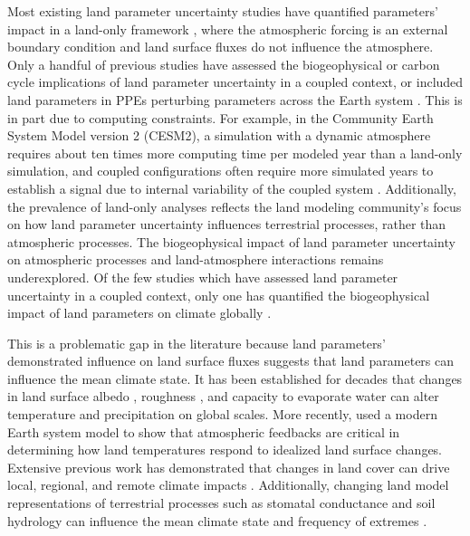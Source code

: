 \documentclass[draft]{agujournal2019}
\begin{document}
Most existing land parameter uncertainty studies have quantified parameters’ impact in a land-only framework \citep{zaehle_effects_2005, dagon_machine_2020, ricciuto_impact_2018, bauerle_carbon_2014, fisher_parametric_2019, dietze_quantitative_2014, bauerle_carbon_2014}, where the atmospheric forcing is an external boundary condition and land surface fluxes do not influence the atmosphere. Only a handful of previous studies have assessed the biogeophysical \citep{liu_constraining_2005,fischer_quantifying_2011,williams_land-atmosphere_2016} or carbon cycle \citep{booth_high_2012, booth_narrowing_2017, hawkins_parametric_2019, mcneall_constraining_2023} implications of land parameter uncertainty in a coupled context, or included land parameters in PPEs perturbing parameters across the Earth system \citep{sexton_perturbed_2021, yamazaki_perturbed_2021}. This is in part due to computing constraints. For example, in the Community Earth System Model version 2 (CESM2), a simulation with a dynamic atmosphere requires about ten times more computing time per modeled year than a land-only simulation, and coupled configurations often require more simulated years to establish a signal due to internal variability of the coupled system \citep{kay_community_2015}. Additionally, the prevalence of land-only analyses reflects the land modeling community’s focus on how land parameter uncertainty influences terrestrial processes, rather than atmospheric processes. The biogeophysical impact of land parameter uncertainty on atmospheric processes and land-atmosphere interactions remains underexplored. Of the few studies which have assessed land parameter uncertainty in a coupled context, only one has quantified the biogeophysical impact of land parameters on climate globally \citep{fischer_quantifying_2011}.

This is a problematic gap in the literature because land parameters’ demonstrated influence on land surface fluxes suggests that land parameters can influence the mean climate state. It has been established for decades that changes in land surface albedo \citep{charney_drought_1975, charney_dynamics_1975, charney_comparative_1977}, roughness \citep{sud_influence_1988}, and capacity to evaporate water \citep{shukla_influence_1982} can alter temperature and precipitation on global scales. More recently, \cite{lague_separating_2019} used a modern Earth system model to show that atmospheric feedbacks are critical in determining how land temperatures respond to idealized land surface changes. Extensive previous work has demonstrated that changes in land cover can drive local, regional, and remote climate impacts \citep[e.g.][]{pongratz_biogeophysical_2010,swann_mid-latitude_2012,boysen_global_2020}. Additionally, changing land model representations of terrestrial processes such as stomatal conductance and soil hydrology can influence the mean climate state \citep{lawrence_partitioning_2007} and frequency of extremes \citep{kala_impact_2016}.
\end{document}
